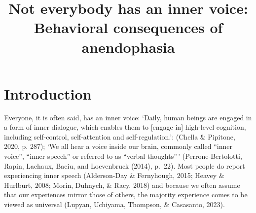 \documentclass[
  man,a4paper,floatsintext]{apa6}
\title{Not everybody has an inner voice: Behavioral consequences of anendophasia}
\author{\phantom{0}}
\date{}
\affiliation{\phantom{0}}
\begin{document}
\maketitle

\setcounter{secnumdepth}{5}

\hypertarget{introduction}{%
\section{Introduction}\label{introduction}}

Everyone, it is often said, has an inner voice: `Daily, human beings are engaged in a form of inner dialogue, which enables them to {[}engage in{]} high-level cognition, including self-control, self-attention and self-regulation.': (Chella \& Pipitone, 2020, p. 287); `We all hear a voice inside our brain, commonly called ``inner voice'', ``inner speech'' or referred to as ``verbal thoughts''\,' (Perrone-Bertolotti, Rapin, Lachaux, Baciu, and Loevenbruck (2014), p.~22). Most people do report experiencing inner speech (Alderson-Day \& Fernyhough, 2015; Heavey \& Hurlburt, 2008; Morin, Duhnych, \& Racy, 2018) and because we often assume that our experiences mirror those of others, the majority experience comes to be viewed as universal (Lupyan, Uchiyama, Thompson, \& Casasanto, 2023).
\end{document}
